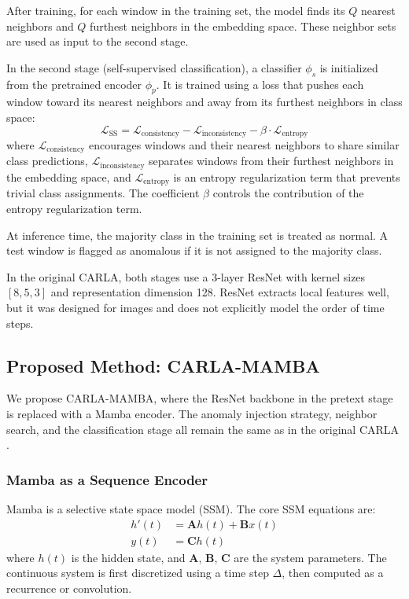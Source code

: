\documentclass[runningheads]{llncs}
\begin{document}
After training, for each window in the training set, the model finds its $Q$ nearest neighbors and $Q$ furthest neighbors in the embedding space. These neighbor sets are used as input to the second stage.

In the second stage (self-supervised classification), a classifier $\phi_s$ is initialized from the pretrained encoder $\phi_p$. It is trained using a loss that pushes each window toward its nearest neighbors and away from its furthest neighbors in class space:
\begin{equation}
\mathcal{L}_{\text{SS}} = \mathcal{L}_{\text{consistency}} - \mathcal{L}_{\text{inconsistency}} - \beta \cdot \mathcal{L}_{\text{entropy}}
\end{equation}
where $\mathcal{L}_{\text{consistency}}$ encourages windows and their nearest neighbors to share similar class predictions, 
$\mathcal{L}_{\text{inconsistency}}$ separates windows from their furthest neighbors in the embedding space, 
and $\mathcal{L}_{\text{entropy}}$ is an entropy regularization term that prevents trivial class assignments. 
The coefficient $\beta$ controls the contribution of the entropy regularization term.

At inference time, the majority class in the training set is treated as normal. A test window is flagged as anomalous if it is not assigned to the majority class.

In the original CARLA, both stages use a 3-layer ResNet with kernel sizes $[8, 5, 3]$ and representation dimension 128. ResNet extracts local features well, but it was designed for images and does not explicitly model the order of time steps.

\subsection{Proposed Method: CARLA-MAMBA}

We propose CARLA-MAMBA, where the ResNet backbone in the pretext stage is replaced with a Mamba encoder. The anomaly injection strategy, neighbor search, and the classification stage all remain the same as in the original CARLA \cite{darban2024carla}.

\subsubsection{Mamba as a Sequence Encoder}

Mamba \cite{gu2023mamba} is a selective state space model (SSM). The core SSM equations are:
\begin{align}
h'(t) &= \mathbf{A}h(t) + \mathbf{B}x(t) \\
y(t) &= \mathbf{C}h(t)
\end{align}
where $h(t)$ is the hidden state, and $\mathbf{A}$, $\mathbf{B}$, $\mathbf{C}$ are the system parameters. The continuous system is first discretized using a time step $\Delta$, then computed as a recurrence or convolution.
\end{document}
